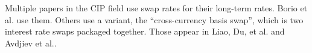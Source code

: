 




Multiple papers in the CIP field use swap rates for their long-term rates.  Borio et al.\cite{Borio2016} use them.  Others use a variant, the ``cross-currency basis swap'', which is two interest rate swaps packaged together.  Those appear in Liao\cite{Liao2016}, Du, et al.\cite{Du2017} and Avdjiev et al.\cite{Avdjiev2016}.  







